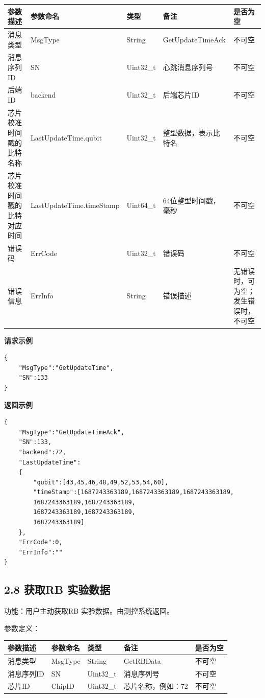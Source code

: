 \documentclass{ctexart}
\begin{document}
\begin{longtable}{|l|l|l|l|l|}
\hline
\textbf{\textbf{参数描述}} & \textbf{\textbf{参数命名}} & \textbf{\textbf{类型}} & \textbf{\textbf{备注}} & \textbf{\textbf{是否为空}} \\
\hline
消息类型 & MsgType & String & GetUpdateTimeAck & 不可空 \\
消息序列ID & SN & Uint32_t & 心跳消息序列号 & 不可空 \\
后端ID & backend & Uint32_t & 后端芯片ID & 不可空 \\
芯片校准时间戳的比特名称 & LastUpdateTime.qubit & Uint32_t & 整型数据，表示比特名 & 不可空 \\
芯片校准时间戳的比特对应时间 & LastUpdateTime.timeStamp & Uint64_t & 64位整型时间戳，毫秒 & 不可空 \\
错误码 & ErrCode & Uint32_t & 错误码 & 不可空 \\
错误信息 & ErrInfo & String & 错误描述 & 无错误时，可为空；发生错误时，不可空 \\
\hline
\end{longtable}

\textbf{请求示例}

\begin{verbatim}{
    "MsgType":"GetUpdateTime",
    "SN":133
}\end{verbatim}

\textbf{返回示例}

\begin{verbatim}{
    "MsgType":"GetUpdateTimeAck",
    "SN":133,
    "backend":72,
    "LastUpdateTime":
    {
        "qubit":[43,45,46,48,49,52,53,54,60],
        "timeStamp":[1687243363189,1687243363189,1687243363189,
        1687243363189,1687243363189,
        1687243363189,1687243363189,
        1687243363189]
    },
    "ErrCode":0,
    "ErrInfo":""
}\end{verbatim}

\subsection{2.8 获取RB 实验数据}

功能：用户主动获取RB 实验数据。由测控系统返回。

参数定义：

\begin{longtable}{|l|l|l|l|l|}
\hline
\textbf{\textbf{参数描述}} & \textbf{\textbf{参数命名}} & \textbf{\textbf{类型}} & \textbf{\textbf{备注}} & \textbf{\textbf{是否为空}} \\
\hline
消息类型 & MsgType & String & GetRBData & 不可空 \\
消息序列ID & SN & Uint32_t & 消息序列号 & 不可空 \\
芯片ID & ChipID & Uint32_t & 芯片名称，例如：72 & 不可空 \\
\hline
\end{longtable}
\end{document}
